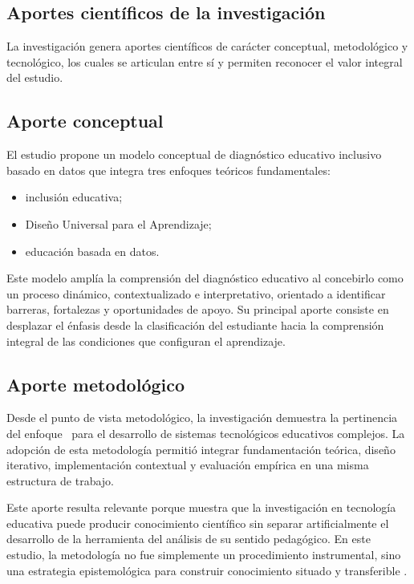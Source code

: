 \begin{refsection}
\section{Aportes científicos de la investigación}

La investigación genera aportes científicos de carácter conceptual, metodológico y tecnológico, los cuales se articulan entre sí y permiten reconocer el valor integral del estudio.

\subsection{Aporte conceptual}

El estudio propone un modelo conceptual de diagnóstico educativo inclusivo basado en datos que integra tres enfoques teóricos fundamentales:

\begin{itemize}
\item inclusión educativa;
\item Diseño Universal para el Aprendizaje;
\item educación basada en datos.
\end{itemize}

Este modelo amplía la comprensión del diagnóstico educativo al concebirlo como un proceso dinámico, contextualizado e interpretativo, orientado a identificar barreras, fortalezas y oportunidades de apoyo. Su principal aporte consiste en desplazar el énfasis desde la clasificación del estudiante hacia la comprensión integral de las condiciones que configuran el aprendizaje.

\subsection{Aporte metodológico}

Desde el punto de vista metodológico, la investigación demuestra la pertinencia del enfoque \DBR\ para el desarrollo de sistemas tecnológicos educativos complejos. La adopción de esta metodología permitió integrar fundamentación teórica, diseño iterativo, implementación contextual y evaluación empírica en una misma estructura de trabajo.

Este aporte resulta relevante porque muestra que la investigación en tecnología educativa puede producir conocimiento científico sin separar artificialmente el desarrollo de la herramienta del análisis de su sentido pedagógico. En este estudio, la metodología no fue simplemente un procedimiento instrumental, sino una estrategia epistemológica para construir conocimiento situado y transferible \parencite{creswell2018,wang2005}.


\end{refsection}
